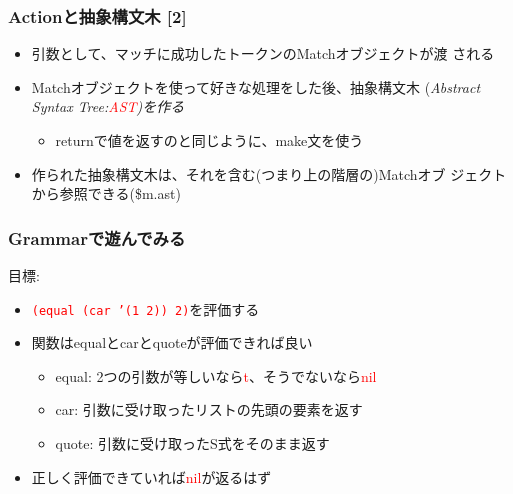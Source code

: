 \documentclass[14pt,dvipdfm,trans]{beamer}
\begin{document}
\begin{frame}
 \frametitle{Actionと抽象構文木 [2]}
 \begin{itemize}
  \item <1-> 引数として、マッチに成功したトークンのMatchオブジェクトが渡
	される
	\vspace{0.5zh}
  \item	<2-> Matchオブジェクトを使って好きな処理をした後、抽象構文木
	(\it{Abstract Syntax Tree:\textcolor{red}{AST}})を作る
	\begin{itemize}
	 \item <3-> returnで値を返すのと同じように、make文を使う
	\end{itemize}
	\vspace{0.3zh}
  \item <4-> 作られた抽象構文木は、それを含む(つまり上の階層の)Matchオブ
	ジェクトから参照できる(\$m.ast)
 \end{itemize}
 \vspace{1zh}
 \pause
\end{frame}

\begin{frame}
\frametitle{Grammarで遊んでみる}
\hspace{0.5zh}目標:
\begin{itemize}
 \item <1-> \textcolor{red}{\tt{(equal (car '(1 2)) 2)}}を評価する
\vspace*{0.3zh}
 \item <2-> 関数はequalとcarとquoteが評価できれば良い
       \vspace*{0.5zh}
       \begin{itemize}
	\item <3-> equal: 2つの引数が等しいなら\textcolor{red}{t}、そうでないなら\textcolor{red}{nil}
	\item <4-> car: 引数に受け取ったリストの先頭の要素を返す
	\item <5-> quote: 引数に受け取ったS式をそのまま返す 
       \end{itemize}
       \vspace*{1zh}
 \item <6-> 正しく評価できていれば\textcolor{red}{nil}が返るはず
\end{itemize} 
\end{frame}
\end{document}
